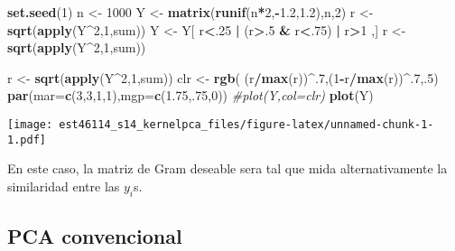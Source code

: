 \documentclass[11pt,]{article}
\newenvironment{Shaded}{\begin{snugshade}}{\end{snugshade}}
\newcommand{\KeywordTok}[1]{\textcolor[rgb]{0.13,0.29,0.53}{\textbf{#1}}}
\newcommand{\DataTypeTok}[1]{\textcolor[rgb]{0.13,0.29,0.53}{#1}}
\newcommand{\DecValTok}[1]{\textcolor[rgb]{0.00,0.00,0.81}{#1}}
\newcommand{\FloatTok}[1]{\textcolor[rgb]{0.00,0.00,0.81}{#1}}
\newcommand{\StringTok}[1]{\textcolor[rgb]{0.31,0.60,0.02}{#1}}
\newcommand{\CommentTok}[1]{\textcolor[rgb]{0.56,0.35,0.01}{\textit{#1}}}
\newcommand{\OperatorTok}[1]{\textcolor[rgb]{0.81,0.36,0.00}{\textbf{#1}}}
\newcommand{\NormalTok}[1]{#1}
\begin{document}
\begin{Shaded}
\begin{Highlighting}[]
\KeywordTok{set.seed}\NormalTok{(}\DecValTok{1}\NormalTok{)}
\NormalTok{n <-}\StringTok{ }\DecValTok{1000}
\NormalTok{Y <-}\StringTok{ }\KeywordTok{matrix}\NormalTok{(}\KeywordTok{runif}\NormalTok{(n}\OperatorTok{*}\DecValTok{2}\NormalTok{,}\OperatorTok{-}\FloatTok{1.2}\NormalTok{,}\FloatTok{1.2}\NormalTok{),n,}\DecValTok{2}\NormalTok{)}
\NormalTok{r <-}\StringTok{ }\KeywordTok{sqrt}\NormalTok{(}\KeywordTok{apply}\NormalTok{(Y}\OperatorTok{^}\DecValTok{2}\NormalTok{,}\DecValTok{1}\NormalTok{,sum))}
\NormalTok{Y <-}\StringTok{ }\NormalTok{Y[  r}\OperatorTok{<}\NormalTok{.}\DecValTok{25} \OperatorTok{|}\StringTok{ }\NormalTok{(r}\OperatorTok{>}\NormalTok{.}\DecValTok{5} \OperatorTok{&}\StringTok{ }\NormalTok{r}\OperatorTok{<}\NormalTok{.}\DecValTok{75}\NormalTok{) }\OperatorTok{|}\StringTok{ }\NormalTok{r}\OperatorTok{>}\DecValTok{1}\NormalTok{  ,]}
\NormalTok{r <-}\StringTok{ }\KeywordTok{sqrt}\NormalTok{(}\KeywordTok{apply}\NormalTok{(Y}\OperatorTok{^}\DecValTok{2}\NormalTok{,}\DecValTok{1}\NormalTok{,sum))}

\NormalTok{r <-}\StringTok{ }\KeywordTok{sqrt}\NormalTok{(}\KeywordTok{apply}\NormalTok{(Y}\OperatorTok{^}\DecValTok{2}\NormalTok{,}\DecValTok{1}\NormalTok{,sum))}
\NormalTok{clr <-}\StringTok{ }\KeywordTok{rgb}\NormalTok{( (r}\OperatorTok{/}\KeywordTok{max}\NormalTok{(r))}\OperatorTok{^}\NormalTok{.}\DecValTok{7}\NormalTok{,(}\DecValTok{1}\OperatorTok{-}\NormalTok{r}\OperatorTok{/}\KeywordTok{max}\NormalTok{(r))}\OperatorTok{^}\NormalTok{.}\DecValTok{7}\NormalTok{,.}\DecValTok{5}\NormalTok{)}
\KeywordTok{par}\NormalTok{(}\DataTypeTok{mar=}\KeywordTok{c}\NormalTok{(}\DecValTok{3}\NormalTok{,}\DecValTok{3}\NormalTok{,}\DecValTok{1}\NormalTok{,}\DecValTok{1}\NormalTok{),}\DataTypeTok{mgp=}\KeywordTok{c}\NormalTok{(}\FloatTok{1.75}\NormalTok{,.}\DecValTok{75}\NormalTok{,}\DecValTok{0}\NormalTok{))}
\CommentTok{#plot(Y,col=clr)}
\KeywordTok{plot}\NormalTok{(Y)}
\end{Highlighting}
\end{Shaded}

\texttt{[image: est46114\_s14\_kernelpca\_files/figure-latex/unnamed-chunk-1-1.pdf]}

En este caso, la matriz de Gram deseable sera tal que mida
alternativamente la similaridad entre las \(y_{i}\)s.

\subsection{PCA convencional}\label{pca-convencional}
\end{document}
